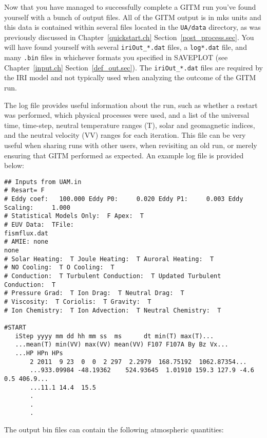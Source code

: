 Now that you have managed to successfully complete a GITM run you've found yourself with a bunch of output files.  All of the GITM output is in mks units and this data is contained within several files located in the {\tt UA/data} directory, as was previously discussed in Chapter~\ref{quickstart.ch} Section~\ref{post_process.sec}.  You will have found yourself with several {\tt iriOut\_*.dat} files, a {\tt log*.dat} file, and many {\tt .bin} files in whichever formats you specified in SAVEPLOT (see Chapter~\ref{input.ch} Section~\ref{def_out.sec}).  The {\tt iriOut\_*.dat} files are required by the IRI model and not typically used when analyzing the outcome of the GITM run.

The log file provides useful information about the run, such as whether a restart was performed, which physical processes were used, and a list of the universal time, time-step, neutral temperature ranges (T), solar and geomagnetic indices, and the neutral velocity (VV) ranges for each iteration.  This file can be very useful when sharing runs with other users, when revisiting an old run, or merely ensuring that GITM performed as expected.  An example log file is provided below:

\begin{verbatim}
## Inputs from UAM.in
# Resart= F
# Eddy coef:   100.000 Eddy P0:     0.020 Eddy P1:     0.003 Eddy Scaling:     1.000
# Statistical Models Only:  F Apex:  T
# EUV Data:  TFile: 
fismflux.dat                                                                                        
# AMIE: none           
none                                                                                                
# Solar Heating:  T Joule Heating:  T Auroral Heating:  T
# NO Cooling:  T O Cooling:  T
# Conduction:  T Turbulent Conduction:  T Updated Turbulent Conduction:  T
# Pressure Grad:  T Ion Drag:  T Neutral Drag:  T
# Viscosity:  T Coriolis:  T Gravity:  T
# Ion Chemistry:  T Ion Advection:  T Neutral Chemistry:  T
 
#START
   iStep yyyy mm dd hh mm ss  ms      dt min(T) max(T)...
   ...mean(T) min(VV) max(VV) mean(VV) F107 F107A By Bz Vx...
   ...HP HPn HPs
       2 2011  9 23  0  0  2 297  2.2979  168.75192  1062.87354...
       ...933.09984 -48.19362    524.93645  1.01910 159.3 127.9 -4.6  0.5 406.9...
       ...11.1 14.4  15.5
       .
       .
       .
\end{verbatim}

The output bin files can contain the following atmospheric quantities:

